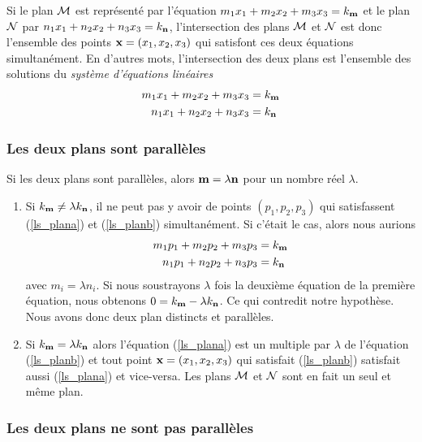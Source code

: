{Si le plan $\cal M$ est représenté par l'équation
$m_1 x_1 + m_2 x_2 + m_3 x_3 = k_{\mathbf{m}}$ et le plan $\cal N$ par 
$n_1 x_1 + n_2 x_2 + n_3 x_3 = k_{\mathbf{n}}$, l'intersection des plans
$\cal M$ et $\cal N$ est donc l'ensemble des points
$\mathbf{x} = (x_1,x_2,x_3)$ qui satisfont ces deux équations 
simultanément.  En d'autres mots, l'intersection des deux plans est
l'ensemble des solutions du {\em système d'équations linéaires}
\begin{subequations}\label{ls_plan}
\begin{align}
m_1 x_1 + m_2 x_2 + m_3 x_3 &= k_{\mathbf{m}} \label{ls_plana} \\
n_1 x_1 + n_2 x_2 + n_3 x_3 &= k_{\mathbf{n}} \label{ls_planb}
\end{align}
\end{subequations}

\subsubsection{Les deux plans sont parallèles}

Si les deux plans sont parallèles, alors $\mathbf{m} = \lambda \mathbf{n}$
pour un nombre réel $\lambda$.
\begin{enumerate}
\item Si $k_{\mathbf{m}} \neq \lambda k_{\mathbf{n}}$, il ne peut pas y
avoir de points 
$(p_1,p_2,p_3)$ qui satisfassent (\ref{ls_plana}) et (\ref{ls_planb})
simultanément.  Si c'était le cas, alors nous aurions
\begin{align*}
m_1 p_1 + m_2 p_2 + m_3 p_3 &= k_{\mathbf{m}} \\
n_1 p_1 + n_2 p_2 + n_3 p_3 &= k_{\mathbf{n}}
\end{align*}
avec $m_i = \lambda n_i$.  Si nous soustrayons $\lambda$ fois la
deuxième équation de la première équation, nous obtenons
$0 = k_{\mathbf{m}} - \lambda k_{\mathbf{n}}$.  Ce qui contredit notre
hypothèse.  Nous avons donc deux plan distincts et parallèles.
\item Si $k_{\mathbf{m}} = \lambda k_{\mathbf{n}}$ alors l'équation
(\ref{ls_plana}) est un 
multiple par $\lambda$ de l'équation (\ref{ls_planb}) et tout point
$\mathbf{x} = (x_1,x_2,x_3)$ qui satisfait (\ref{ls_planb}) satisfait aussi
(\ref{ls_plana}) et vice-versa.  Les plans $\cal M$ et $\cal N$ sont
en fait un seul et même plan.
\end{enumerate}

\subsubsection{Les deux plans ne sont pas parallèles}

}
